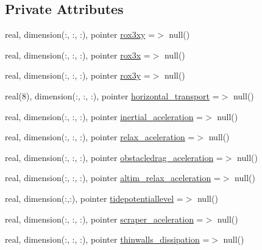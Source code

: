 \subsection*{Private Attributes}
\begin{DoxyCompactItemize}
\item 
real, dimension(\+:, \+:, \+:), pointer \mbox{\hyperlink{structmodulehydrodynamic_1_1t__forces_a5f4c1d436c8512ff0b8057126d1be7d9}{rox3xy}} =$>$ null()
\item 
real, dimension(\+:, \+:, \+:), pointer \mbox{\hyperlink{structmodulehydrodynamic_1_1t__forces_a477252cc564b8907c3bcb64485ba32fd}{rox3x}} =$>$ null()
\item 
real, dimension(\+:, \+:, \+:), pointer \mbox{\hyperlink{structmodulehydrodynamic_1_1t__forces_abd9cfed5f79e5d96c4e615097ae0695b}{rox3y}} =$>$ null()
\item 
real(8), dimension(\+:, \+:, \+:), pointer \mbox{\hyperlink{structmodulehydrodynamic_1_1t__forces_a412b92280ab053a30f5049d40af7e29b}{horizontal\+\_\+transport}} =$>$ null()
\item 
real, dimension(\+:, \+:, \+:), pointer \mbox{\hyperlink{structmodulehydrodynamic_1_1t__forces_a934db5c6577a87ae809f693fd537aa35}{inertial\+\_\+aceleration}} =$>$ null()
\item 
real, dimension(\+:, \+:, \+:), pointer \mbox{\hyperlink{structmodulehydrodynamic_1_1t__forces_a451e1d652695aa926af437e9dec5138c}{relax\+\_\+aceleration}} =$>$ null()
\item 
real, dimension(\+:, \+:, \+:), pointer \mbox{\hyperlink{structmodulehydrodynamic_1_1t__forces_ad8cb80740c1d9bbbea850b7d0413cdd2}{obstacledrag\+\_\+aceleration}} =$>$ null()
\item 
real, dimension(\+:, \+:, \+:), pointer \mbox{\hyperlink{structmodulehydrodynamic_1_1t__forces_ad2f0bf5ad3bb373989f0064710901afc}{altim\+\_\+relax\+\_\+aceleration}} =$>$ null()
\item 
real, dimension(\+:,\+:), pointer \mbox{\hyperlink{structmodulehydrodynamic_1_1t__forces_aa44992c7de7c85d8996c82ddf26cfe98}{tidepotentiallevel}} =$>$ null()
\item 
real, dimension(\+:, \+:, \+:), pointer \mbox{\hyperlink{structmodulehydrodynamic_1_1t__forces_a9827f17cdf29c4fc1972d31b8dccf74e}{scraper\+\_\+aceleration}} =$>$ null()
\item 
real, dimension(\+:, \+:, \+:), pointer \mbox{\hyperlink{structmodulehydrodynamic_1_1t__forces_a0f4619d7de84f65ad97411e93e5f0c36}{thinwalls\+\_\+dissipation}} =$>$ null()
\item 

\end{DoxyCompactItemize}
